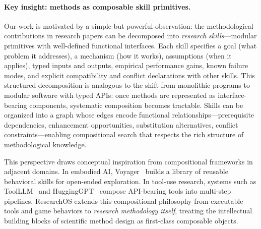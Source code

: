 \paragraph{Key insight: methods as composable skill primitives.}
Our work is motivated by a simple but powerful observation: the methodological
contributions in research papers can be decomposed into \emph{research
skills}---modular primitives with well-defined functional interfaces. Each
skill specifies a goal (what problem it addresses), a mechanism (how it works),
assumptions (when it applies), typed inputs and outputs, empirical performance
gains, known failure modes, and explicit compatibility and conflict
declarations with other skills. This structured decomposition is analogous to
the shift from monolithic programs to modular software with typed APIs: once
methods are represented as interface-bearing components, systematic composition
becomes tractable. Skills can be organized into a graph whose edges encode
functional relationships---prerequisite dependencies, enhancement
opportunities, substitution alternatives, conflict constraints---enabling
compositional search that respects the rich structure of methodological
knowledge.

This perspective draws conceptual inspiration from compositional frameworks in
adjacent domains. In embodied AI, Voyager~\cite{wang2023voyager} builds a
library of reusable behavioral skills for open-ended exploration. In tool-use
research, systems such as ToolLLM~\cite{qin2023toolllm} and
HuggingGPT~\cite{shen2023hugginggpt} compose API-bearing tools into
multi-step pipelines. ResearchOS extends this compositional philosophy from
executable tools and game behaviors to \emph{research methodology itself},
treating the intellectual building blocks of scientific method design as
first-class composable objects.


